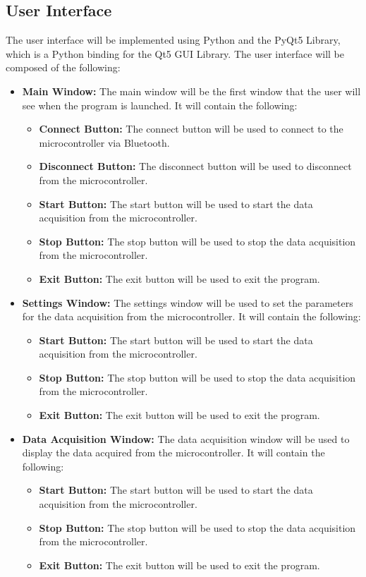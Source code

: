 \documentclass[12pt]{article}
\numberwithin{equation}{section}
\begin{document}
\subsection{User Interface}
The user interface will be implemented using Python and the PyQt5 Library, which is a Python binding for the Qt5 GUI Library. The user interface will be composed of the following:
\begin{itemize}
  \item \textbf{Main Window:} The main window will be the first window that the user will see when the program is launched. It will contain the following:
  \begin{itemize}
    \item \textbf{Connect Button:} The connect button will be used to connect to the microcontroller via Bluetooth.
    \item \textbf{Disconnect Button:} The disconnect button will be used to disconnect from the microcontroller.
    \item \textbf{Start Button:} The start button will be used to start the data acquisition from the microcontroller.
    \item \textbf{Stop Button:} The stop button will be used to stop the data acquisition from the microcontroller.
    \item \textbf{Exit Button:} The exit button will be used to exit the program.
  \end{itemize}
  \item \textbf{Settings Window:} The settings window will be used to set the parameters for the data acquisition from the microcontroller. It will contain the following:
  \begin{itemize}
    \item \textbf{Start Button:} The start button will be used to start the data acquisition from the microcontroller.
    \item \textbf{Stop Button:} The stop button will be used to stop the data acquisition from the microcontroller.
    \item \textbf{Exit Button:} The exit button will be used to exit the program.
  \end{itemize}
  \item \textbf{Data Acquisition Window:} The data acquisition window will be used to display the data acquired from the microcontroller. It will contain the following:
  \begin{itemize}
    \item \textbf{Start Button:} The start button will be used to start the data acquisition from the microcontroller.
    \item \textbf{Stop Button:} The stop button will be used to stop the data acquisition from the microcontroller.
    \item \textbf{Exit Button:} The exit button will be used to exit the program.
  \end{itemize}
\end{itemize}
\end{document}
